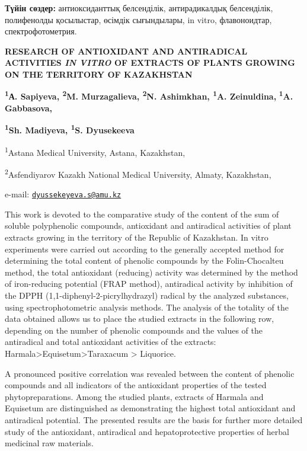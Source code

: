 {\bfseries Түйін сөздер:} антиоксиданттық белсенділік, антирадикалдық
белсенділік, полифенолды қосылыстар, өсімдік сығындылары, in vitro,
флавоноидтар, спектрофотометрия.

\begin{articleheader}
{\bfseries RESEARCH OF ANTIOXIDANT AND ANTIRADICAL ACTIVITIES \emph{IN
VITRO} OF EXTRACTS OF PLANTS GROWING ON THE TERRITORY OF KAZAKHSTAN}

{\bfseries \textsuperscript{1}А. Sapiyeva, \textsuperscript{2}M.
Murzagalieva, \textsuperscript{2}N. Ashimkhan, \textsuperscript{1}A.
Zeinuldina,} {\bfseries \textsuperscript{1}A. Gabbasova,}

{\bfseries \textsuperscript{1}Sh. Madiyeva, \textsuperscript{1}S.
Dyusekeeva}\textsuperscript{\envelope }
\end{articleheader}

\begin{affiliation}
\textsuperscript{1}Astana Medical University, Astana, Kazakhstan,

\textsuperscript{2}Asfendiyarov Kazakh National Medical University,
Almaty, Kazakhstan,

e-mail:
\href{mailto:dyussekeyeva.s@amu.kz}{\nolinkurl{dyussekeyeva.s@amu.kz}}
\end{affiliation}

This work is devoted to the comparative study of the content of the sum
of soluble polyphenolic compounds, antioxidant and antiradical
activities of plant extracts growing in the territory of the Republic of
Kazakhstan. In vitro experiments were carried out according to the
generally accepted method for determining the total content of phenolic
compounds by the Folin-Chocalteu method, the total antioxidant
(reducing) activity was determined by the method of iron-reducing
potential (FRAP method), antiradical activity by inhibition of the DPPH
(1,1-diphenyl-2-picrylhydrazyl) radical by the analyzed substances,
using spectrophotometric analysis methods. The analysis of the totality
of the data obtained allows us to place the studied extracts in the
following row, depending on the number of phenolic compounds and the
values of the antiradical and total antioxidant activities of the
extracts: Harmala\textgreater Equisetum\textgreater Taraxacum
\textgreater{} Liquorice.

A pronounced positive correlation was revealed between the content of
phenolic compounds and all indicators of the antioxidant properties of
the tested phytopreparations. Among the studied plants, extracts of
Harmala and Equisetum are distinguished as demonstrating the highest
total antioxidant and antiradical potential. The presented results are
the basis for further more detailed study of the antioxidant,
antiradical and hepatoprotective properties of herbal medicinal raw
materials.

